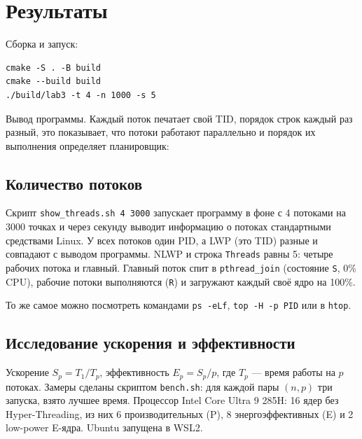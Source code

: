 \section{Результаты}
Сборка и запуск:

\begin{lstlisting}[language={}]
cmake -S . -B build
cmake --build build
./build/lab3 -t 4 -n 1000 -s 5
\end{lstlisting}

Вывод программы. Каждый поток печатает свой TID, порядок строк каждый раз разный, это показывает, что потоки работают параллельно и порядок их выполнения определяет планировщик:



\subsection*{Количество потоков}
Скрипт \texttt{show\_threads.sh 4 3000} запускает программу в фоне с 4 потоками на 3000 точках и через секунду выводит информацию о потоках стандартными средствами Linux. У всех потоков один PID, а LWP (это TID) разные и совпадают с выводом программы. NLWP и строка \texttt{Threads} равны 5: четыре рабочих потока и главный. Главный поток спит в \texttt{pthread\_join} (состояние \texttt{S}, 0\% CPU), рабочие потоки выполняются (\texttt{R}) и загружают каждый своё ядро на 100\%.



То же самое можно посмотреть командами \texttt{ps -eLf}, \texttt{top -H -p PID} или в \texttt{htop}.

\subsection*{Исследование ускорения и эффективности}
Ускорение $S_p = T_1 / T_p$, эффективность $E_p = S_p / p$, где $T_p$ --- время работы на $p$ потоках. Замеры сделаны скриптом \texttt{bench.sh}: для каждой пары $(n, p)$ три запуска, взято лучшее время. Процессор Intel Core Ultra 9 285H: 16 ядер без Hyper-Threading, из них 6 производительных (P), 8 энергоэффективных (E) и 2 low-power E-ядра. Ubuntu запущена в WSL2.

